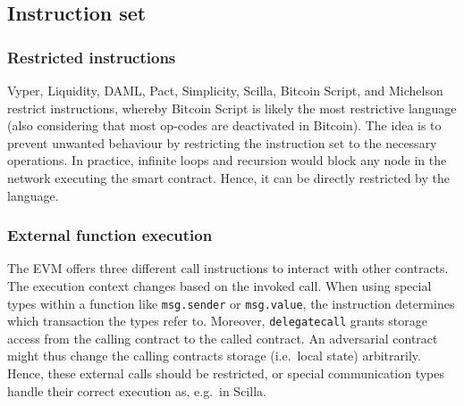 
\subsection{Instruction set}
\subsubsection{Restricted instructions}
Vyper, Liquidity, DAML, Pact, Simplicity, Scilla, Bitcoin Script, and Michelson restrict instructions, whereby Bitcoin Script is likely the most restrictive language (also considering that most op-codes are deactivated in Bitcoin). 
The idea is to prevent unwanted behaviour by restricting the instruction set to the necessary operations.
In practice, infinite loops and recursion would block any node in the network executing the smart contract. Hence, it can be directly restricted by the language.

\subsubsection{External function execution}
The EVM offers three different call instructions to interact with other contracts. The execution context changes based on the invoked call. When using special types within a function like \texttt{msg.sender} or \texttt{msg.value}, the instruction determines which transaction the types refer to. Moreover, \texttt{delegatecall} grants storage access from the calling contract to the called contract. An adversarial contract might thus change the calling contracts storage (i.e.\ local state) arbitrarily. Hence, these external calls should be restricted, or special communication types handle their correct execution as, e.g.\ in Scilla.

